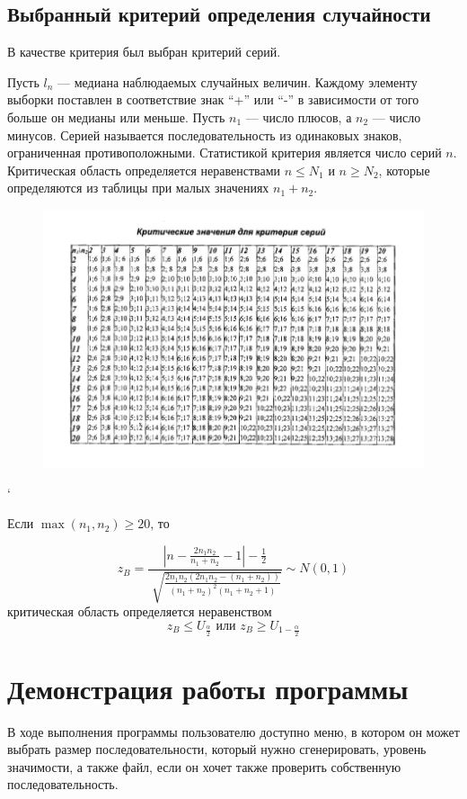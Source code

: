 \subsection*{Выбранный критерий определения случайности}
В качестве критерия был выбран критерий серий.

Пусть $l_n$ --- медиана наблюдаемых случайных величин. Каждому элементу выборки поставлен в соответствие знак ``+'' или ``-'' в зависимости от того больше он медианы или меньше. Пусть $n_1$ --- число плюсов, а $n_2$ --- число минусов. Серией называется последовательность из одинаковых знаков, ограниченная противоположными. Статистикой критерия является число серий $n$. Критическая область определяется неравенствами $n \le N_1$ и $n \ge N_2$, которые определяются из таблицы при малых значениях $n_1+n_2$. 


\begin{figure}[H]
	\centering
	\includegraphics[width=1\linewidth]{inc/serial-table}
	\label{fig:serial-table}
\end{figure}`

Если $\max(n_1, n_2) \ge 20$, то

\[z_B=\frac{|n - \frac{2n_1n_2}{n_1+n_2} - 1| - \frac{1}{2}}{\sqrt[]{\frac{2n_1n_2(2n_1n_2-(n_1+n_2))}{(n_1+n_2)^2(n_1+n_2+1)}}} \sim N(0,1)\]
критическая область определяется неравенством 
\[z_B \le U_{\frac{\alpha}{2}} \text{	или	} z_B \ge  U_{1 - \frac{\alpha}{2}}\]

\section*{Демонстрация работы программы}

В ходе выполнения программы пользователю доступно меню, в котором он может выбрать размер последовательности, который нужно сгенерировать, уровень значимости, а также файл, если он хочет также проверить собственную последовательность.


